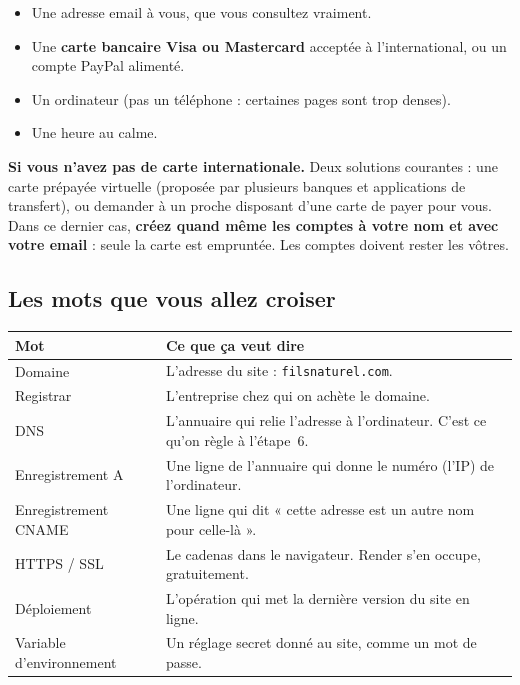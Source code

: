 \documentclass[11pt,a4paper]{article}
\newcommand{\saisir}[1]{\texttt{#1}}
\begin{document}
\begin{itemize}
  \item Une adresse email à vous, que vous consultez vraiment.
  \item Une \textbf{carte bancaire Visa ou Mastercard} acceptée à
        l'international, ou un compte PayPal alimenté.
  \item Un ordinateur (pas un téléphone : certaines pages sont trop denses).
  \item Une heure au calme.
\end{itemize}

\begin{conseil}
\textbf{Si vous n'avez pas de carte internationale.} Deux solutions courantes :
une carte prépayée virtuelle (proposée par plusieurs banques et applications de
transfert), ou demander à un proche disposant d'une carte de payer pour vous.
Dans ce dernier cas, \textbf{créez quand même les comptes à votre nom et avec
votre email} : seule la carte est empruntée. Les comptes doivent rester les
vôtres.
\end{conseil}

\subsection{Les mots que vous allez croiser}

\begin{center}
\begin{tabularx}{\textwidth}{@{}lX@{}}
\toprule
\textbf{Mot} & \textbf{Ce que ça veut dire} \\
\midrule
Domaine & L'adresse du site : \saisir{filsnaturel.com}. \\
Registrar & L'entreprise chez qui on achète le domaine. \\
DNS & L'annuaire qui relie l'adresse à l'ordinateur. C'est ce qu'on règle à l'étape~6. \\
Enregistrement A & Une ligne de l'annuaire qui donne le numéro (l'IP) de l'ordinateur. \\
Enregistrement CNAME & Une ligne qui dit « cette adresse est un autre nom pour celle-là ». \\
HTTPS / SSL & Le cadenas dans le navigateur. Render s'en occupe, gratuitement. \\
Déploiement & L'opération qui met la dernière version du site en ligne. \\
Variable d'environnement & Un réglage secret donné au site, comme un mot de passe. \\
\bottomrule
\end{tabularx}
\end{center}
\end{document}
